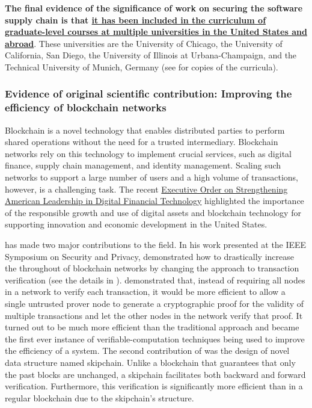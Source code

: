 \qu{\ldots}

\textbf{The final evidence of the significance of \drs work on securing the
software supply chain is that \uline{it has been included in the curriculum of
graduate-level courses at multiple universities in the United States and
abroad}}.
These universities are the University of Chicago, the University of
California, San Diego, the University of Illinois at Urbana-Champaign, and the
Technical University of Munich, Germany (see  for copies of
the curricula).


\subsubsection{Evidence of original scientific contribution: Improving the efficiency of blockchain networks}
\label{sec:blockchain}

Blockchain is a novel technology that enables distributed parties to
perform shared operations without the need for a trusted intermediary.
Blockchain networks rely on this technology to implement crucial services, such
as digital finance, supply chain management, and identity management.
Scaling such networks to support a large number of users and a high volume of
transactions, however, is a challenging task.
The recent \uline{Executive Order on Strengthening American Leadership
in Digital Financial Technology} highlighted the importance of the
responsible growth and use of digital assets and blockchain technology for
supporting innovation and economic development in the United States.

\dr has made two major contributions to the field.
In his work presented at the IEEE Symposium on Security and Privacy, \dr
demonstrated how to drastically increase the throughout of blockchain networks
by changing the approach to transaction verification (see the details in
).
\dr demonstrated that, instead of requiring all nodes in a network to
verify each transaction, it would be more efficient to allow a single untrusted
prover node to generate a cryptographic proof for the validity of multiple
transactions and let the other nodes in the network verify that proof.
It turned out to be much more efficient than the traditional approach and
became the first ever instance of verifiable-computation techniques being used
to improve the efficiency of a system.
The second contribution of \dr was the design of novel data structure named
skipchain.
Unlike a blockchain that guarantees that only the past blocks are unchanged, a
skipchain facilitates both backward and forward verification.
Furthermore, this verification is significantly more efficient than in a regular
blockchain due to the skipchain's structure.

